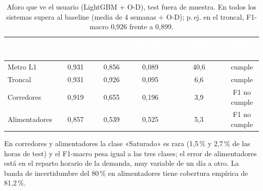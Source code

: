 \documentclass[11pt]{article}
\begin{document}
\begin{table}[H]
\centering\small
\begin{tabular}{@{}lccccc@{}}
\toprule
\rowcolor{tablehead} \textcolor{white}{\bfseries Sistema} & \textcolor{white}{\bfseries Accuracy} & \textcolor{white}{\bfseries F1-macro} & \textcolor{white}{\bfseries WMAPE carga} & \textcolor{white}{\bfseries MAE (pas./veh.)} & \textcolor{white}{\bfseries RNF-01} \\
\midrule
Metro L1 & 0,931 & 0,856 & 0,089 & 40,6 & cumple \\
\rowcolor{tablerow} Troncal & 0,931 & 0,926 & 0,095 & 6,6 & cumple \\
Corredores & 0,919 & 0,655 & 0,196 & 3,9 & F1 no cumple \\
\rowcolor{tablerow} Alimentadores & 0,857 & 0,539 & 0,525 & 5,3 & F1 no cumple \\
\bottomrule
\end{tabular}
\caption{Aforo que ve el usuario (LightGBM + O-D), test fuera de muestra. En todos los sistemas
supera al baseline (media de 4 semanas + O-D); p.\,ej. en el troncal, F1-macro 0,926 frente a 0,899.}
\end{table}

En corredores y alimentadores la clase «Saturado» es rara (1,5\,\% y 2,7\,\% de las horas de test)
y el F1-macro pesa igual a las tres clases; el error de alimentadores está en el reparto horario de
la demanda, muy variable de un día a otro. La banda de incertidumbre del 80\,\% en alimentadores
tiene cobertura empírica de 81,2\,\%.
\end{document}
